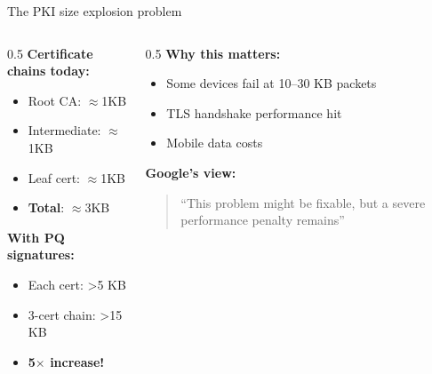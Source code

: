\ifdefined\PRESENTATION\else\PassOptionsToClass{handout}{beamer}\fi\documentclass[aspectratio=169, lualatex]{beamer}
\begin{document}
\begin{frame}{The PKI size explosion problem}
	\begin{columns}[c]
		\begin{column}{0.5\textwidth}
			\textbf{Certificate chains today:}
			\begin{itemize}
				\item Root CA: $\approx$1KB
				\item Intermediate: $\approx$1KB
				\item Leaf cert: $\approx$1KB
				\item \textbf{Total}: $\approx$3KB
			\end{itemize}
			\vspace{5mm}
			\textbf{With PQ signatures:}
			\begin{itemize}
				\item Each cert: >5 KB
				\item 3-cert chain: >15 KB
				\item \textbf{5$\times$ increase!}
			\end{itemize}
		\end{column}
		\begin{column}{0.5\textwidth}
			\textbf{Why this matters:}
			\begin{itemize}
				\item Some devices fail at 10--30 KB packets
				\item TLS handshake performance hit
				\item Mobile data costs
			\end{itemize}
			\vspace{5mm}
			\textbf{Google's view:}
			\begin{quote}
				``This problem might be fixable, but a severe performance penalty remains''
			\end{quote}
		\end{column}
	\end{columns}
\end{frame}
\end{document}
